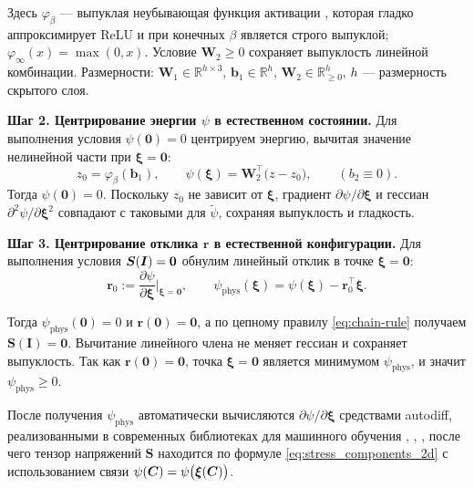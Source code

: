 Здесь $\varphi_{\beta}$ — выпуклая неубывающая функция активации \cite{dugas2001incorporating}, 
которая гладко аппроксимирует ReLU и при конечных $\beta$ является строго выпуклой; $\varphi_{\infty}(x)=\max(0,x)$.
Условие $\mathbf{W}_2\!\ge 0$ сохраняет выпуклость линейной комбинации. 
Размерности: $\mathbf{W}_1\!\in\mathbb{R}^{h\times 3}$, $\mathbf{b}_1\!\in\mathbb{R}^{h}$, 
$\mathbf{W}_2\!\in\mathbb{R}^{h}_{\ge 0}$, $h$ — размерность скрытого слоя.

\textbf{Шаг 2. Центрирование энергии $\psi$ в естественном состоянии.}
Для выполнения условия $\psi(\mathbf{0})=0$ центрируем энергию, 
вычитая значение нелинейной части при $\boldsymbol{\xi}=\mathbf{0}$:
\begin{equation}
  z_0 = \varphi_{\beta}(\mathbf{b}_1),\qquad
  \psi(\boldsymbol{\xi}) = \mathbf{W}_2^{\top}\big(z - z_0\big),\qquad (b_2 \equiv 0).
  \label{eq:center_psi}
\end{equation}
Тогда $\psi(\mathbf{0})=0$. Поскольку $z_0$ не зависит от $\boldsymbol{\xi}$, 
градиент $\partial\psi/\partial\boldsymbol{\xi}$ и гессиан $\partial^2\psi/\partial\boldsymbol{\xi}^2$ 
совпадают с таковыми для $\tilde{\psi}$, сохраняя выпуклость и гладкость.

\textbf{Шаг 3. Центрирование отклика $\mathbf{r}$ в естественной конфигурации.}
Для выполнения условия $\boldsymbol{S}(\boldsymbol{I})=\boldsymbol{0}$ обнулим линейный отклик в точке 
$\boldsymbol{\xi}=\mathbf{0}$:
\begin{equation}
  \mathbf{r}_0 := \frac{\partial \psi}{\partial \boldsymbol{\xi}}\bigg|_{\boldsymbol{\xi}=\mathbf{0}},\qquad
  \psi_{\mathrm{phys}}(\boldsymbol{\xi}) = \psi(\boldsymbol{\xi}) - \mathbf{r}_0^{\top}\boldsymbol{\xi}.
  \label{eq:phys_energy}
\end{equation}

Тогда $\psi_{\mathrm{phys}}(\mathbf{0})=0$ и $\mathbf{r}(\mathbf{0})=\mathbf{0}$, 
а по цепному правилу \eqref{eq:chain-rule} получаем $\mathbf{S}(\mathbf{I})=\mathbf{0}$. 
Вычитание линейного члена не меняет гессиан и сохраняет выпуклость. 
Так как $\mathbf{r}(\mathbf{0})=\mathbf{0}$, точка $\boldsymbol{\xi}=\mathbf{0}$ является минимумом 
$\psi_{\mathrm{phys}}$, и значит $\psi_{\mathrm{phys}}\ge 0$.

После получения $\psi_{\mathrm{phys}}$ автоматически вычисляются 
$\partial\psi/\partial\boldsymbol{\xi}$ средствами autodiff, реализованными в современных библиотеках для машинного обучения 
\cite{pytorch2019}, \cite{tensorflow2016}, \cite{jax2018}, 
после чего тензор напряжений $\mathbf{S}$ находится по формуле \eqref{eq:stress_components_2d} с 
использованием связи $\psi(\boldsymbol{C})=\psi\big(\boldsymbol{\xi}(\boldsymbol{C})\big)$.

